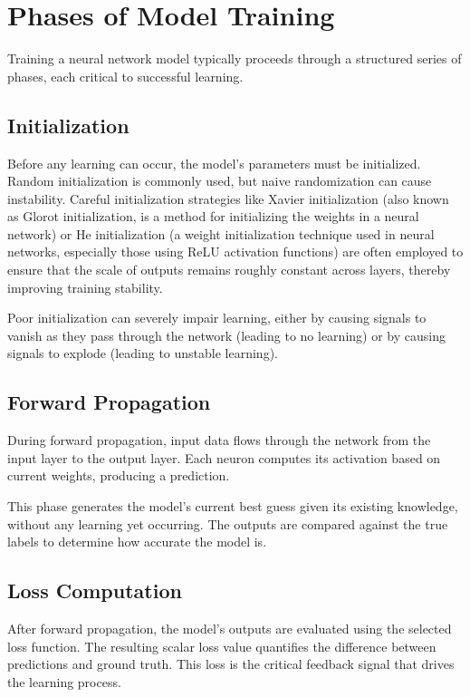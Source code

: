 \documentclass[openany]{book}
\begin{document}
\section{Phases of Model Training}

Training a neural network model typically proceeds through a structured series 
of phases, each critical to successful learning.

\subsection{Initialization}

Before any learning can occur, the model's parameters must be initialized. 
Random initialization is commonly used, but naive randomization can cause 
instability. Careful initialization strategies like Xavier initialization 
(also known as Glorot initialization, is a method for initializing the 
weights in a neural network) or He initialization (a weight initialization 
technique used in neural networks, especially those using ReLU activation 
functions) are often employed to ensure that the scale of outputs remains 
roughly constant across layers, thereby improving training stability.

Poor initialization can severely impair learning, either by causing signals to 
vanish as they pass through the network (leading to no learning) or by causing 
signals to explode (leading to unstable learning).

\subsection{Forward Propagation}

During forward propagation, input data flows through the network from the input 
layer to the output layer. Each neuron computes its activation based on current 
weights, producing a prediction.

This phase generates the model's current best guess given its existing 
knowledge, without any learning yet occurring. The outputs are compared against 
the true labels to determine how accurate the model is.

\subsection{Loss Computation}

After forward propagation, the model's outputs are evaluated using the selected 
loss function. The resulting scalar loss value quantifies the difference between 
predictions and ground truth. This loss is the critical feedback signal that 
drives the learning process.
\end{document}
